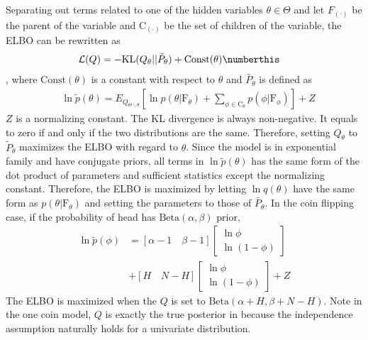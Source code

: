 Separating out terms related to one of the hidden variables $\theta \in
\Theta$ and let $F_{(\cdot)}$ be the parent of the variable and
$\mathrm{C}_{(\cdot)}$ be the set of children of the variable, the ELBO can be
rewritten as
\begin{align*}
	&\mathcal{L}(Q) = -\mathrm{KL}(Q_\theta || \tilde{P}_\theta) +
	\mathrm{Const}(\theta) \numberthis \label{eqn:ELBO_one_term}
\end{align*}
, where $\mathrm{Const}(\theta)$ is a constant with respect to $\theta$ and $\tilde{P_\theta}$ is defined as
\begin{align*}
	&\ln\tilde{p}(\theta) = E_{Q_{\Theta \backslash
	\theta}}[\ln p(\theta|\mathrm{F}_\theta) + \sum_{\phi \in
	\mathrm{C}_\theta }p(\phi|\mathrm{F}_\phi)] + Z
\end{align*}
$Z$ is a normalizing constant. The KL divergence is always non-negative. It
equals to zero if and only if the two distributions are the same. Therefore,
setting $Q_\theta$ to $\tilde{P}_\theta$ maximizes the ELBO with regard to
$\theta$.  Since the model is in exponential family and have conjugate priors,
all terms in $\ln \tilde{p}(\theta)$ has the same form of the dot product of
parameters and sufficient statistics except the normalizing constant.
Therefore, the ELBO is maximized by letting $\ln q(\theta)$ have the same form
as $p(\theta|\mathrm{F}_\theta)$ and setting the parameters to those of
$\tilde{P_\theta}$.  In the coin flipping case, if the probability of head has
$\mathrm{Beta}(\alpha, \beta)$ prior,
\begin{align*}
\ln\tilde{p}(\phi) &= [\alpha - 1 \quad \beta - 1] 
	\begin{bmatrix} \ln \phi \\ \ln(1-\phi) \end{bmatrix}  \\
	&+ [H \quad N-H]  \begin{bmatrix} \ln \phi \\ \ln(1-\phi) \end{bmatrix} + Z
\end{align*}
The ELBO is maximized when the $Q$ is set to $\mathrm{Beta}(\alpha + H,
\beta + N - H)$. Note in the one coin model, $Q$ is exactly the true
posterior in  because the independence assumption
naturally holds for a univariate distribution.

